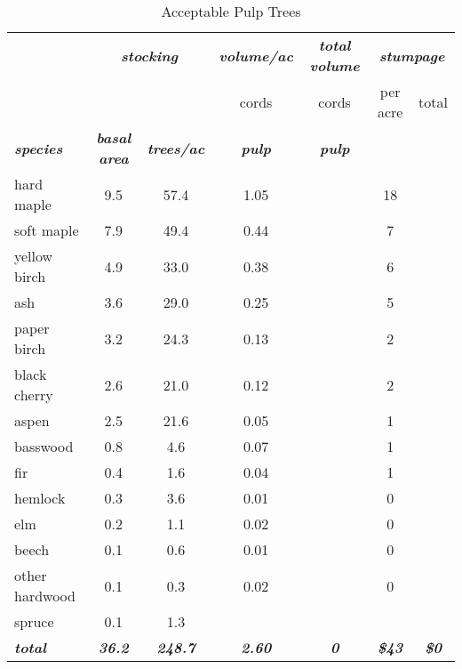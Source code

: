 \documentclass[landscape]{article}
\begin{document}
\begin{table}[H]

\caption{\label{tab:unnamed-chunk-7}Acceptable Pulp Trees}
\fontsize{10}{12}\selectfont
\begin{tabular}[t]{lcccccc}
\toprule
\multicolumn{1}{c}{\em{\textbf{ }}} & \multicolumn{2}{c}{\em{\textbf{stocking}}} & \multicolumn{1}{c}{\em{\textbf{volume/ac }}} & \multicolumn{1}{c}{\em{\textbf{total volume}}} & \multicolumn{2}{c}{\em{\textbf{stumpage}}} \\
\cmidrule(l{3pt}r{3pt}){2-3} \cmidrule(l{3pt}r{3pt}){4-4} \cmidrule(l{3pt}r{3pt}){5-5} \cmidrule(l{3pt}r{3pt}){6-7}
\multicolumn{3}{c}{ } & \multicolumn{1}{c}{cords} & \multicolumn{1}{c}{cords} & \multicolumn{1}{c}{per acre} & \multicolumn{1}{c}{total} \\
\cmidrule(l{3pt}r{3pt}){4-4} \cmidrule(l{3pt}r{3pt}){5-5} \cmidrule(l{3pt}r{3pt}){6-6} \cmidrule(l{3pt}r{3pt}){7-7}
\rowcolor[HTML]{DCDCDC}  \em{\textbf{species}} & \em{\textbf{basal area}} & \em{\textbf{trees/ac}} & \em{\textbf{pulp}} & \em{\textbf{pulp}} & \em{\textbf{ }} & \em{\textbf{ }}\\
\midrule
\rowcolor{gray!6}  hard maple & 9.5 & 57.4 & 1.05 &  & 18 & \\
 
soft maple & 7.9 & 49.4 & 0.44 &  & 7 & \\
 
\rowcolor{gray!6}  yellow birch & 4.9 & 33.0 & 0.38 &  & 6 & \\
 
ash & 3.6 & 29.0 & 0.25 &  & 5 & \\
 
\rowcolor{gray!6}  paper birch & 3.2 & 24.3 & 0.13 &  & 2 & \\
 
black cherry & 2.6 & 21.0 & 0.12 &  & 2 & \\
 
\rowcolor{gray!6}  aspen & 2.5 & 21.6 & 0.05 &  & 1 & \\
 
basswood & 0.8 & 4.6 & 0.07 &  & 1 & \\
 
\rowcolor{gray!6}  fir & 0.4 & 1.6 & 0.04 &  & 1 & \\
 
hemlock & 0.3 & 3.6 & 0.01 &  & 0 & \\
 
\rowcolor{gray!6}  elm & 0.2 & 1.1 & 0.02 &  & 0 & \\
 
beech & 0.1 & 0.6 & 0.01 &  & 0 & \\
 
\rowcolor{gray!6}  other hardwood & 0.1 & 0.3 & 0.02 &  & 0 & \\
 
spruce & 0.1 & 1.3 &  &  &  & \\
 
\rowcolor{gray!6}  \rowcolor[HTML]{DCDCDC}  \em{\textbf{total}} & \em{\textbf{36.2}} & \em{\textbf{248.7}} & \em{\textbf{2.60}} & \em{\textbf{0}} & \em{\textbf{\$43}} & \em{\textbf{\$0}}\\
\bottomrule
\end{tabular}
\end{table}
\end{document}
